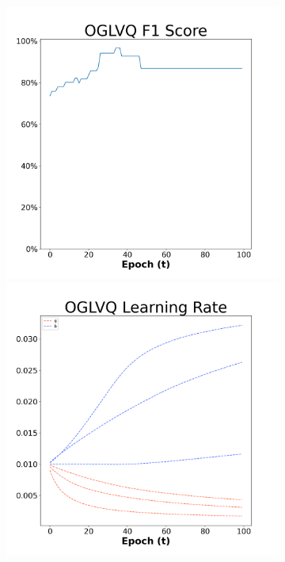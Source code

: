 \begin{figure}[H]
    \centering %
\begin{subfigure}{0.3\textwidth}
  \includegraphics[width=\linewidth]{images/exper2/Ionosphere/OGLVQ_0.01_f1.png}
    \includegraphics[width=\linewidth]{images/exper2/Ionosphere/OGLVQ_0.01_lr.png}

\end{subfigure}
\end{figure}
